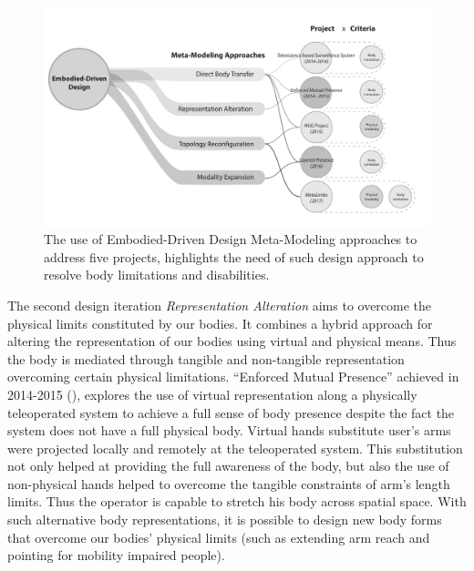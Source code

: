 
\begin{figure}[t!]
  \centering
	  \centerline{\includegraphics[width=1.2\linewidth]{figures/intro/MetaModelingOverview.pdf}}
  \captionsetup{justification=centering}
  \caption{The use of Embodied-Driven Design Meta-Modeling approaches to address five projects, highlights the need of such design approach to resolve body limitations and disabilities.}
  \label{fig:intro-progression}
\end{figure}

The second design iteration \textit{Representation Alteration} aims to overcome the physical limits constituted by our bodies. It combines a hybrid approach for altering the representation of our bodies using virtual and physical means. Thus the body is mediated through tangible and non-tangible representation overcoming certain physical limitations. ``Enforced Mutual Presence'' achieved in 2014-2015 (), explores the use of virtual representation along a physically teleoperated system to achieve a full sense of body presence despite the fact the system does not have a full physical body. Virtual hands substitute user's arms were projected locally and remotely at the teleoperated system. This substitution not only helped at providing the full awareness of the body, but also the use of non-physical hands helped to overcome the tangible constraints of arm's length limits. Thus the operator is capable to stretch his body across spatial space. With such alternative body representations, it is possible to design new body forms that overcome our bodies' physical limits (such as extending arm reach and pointing for mobility impaired people).

